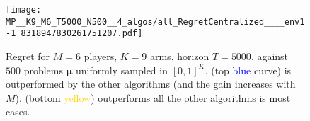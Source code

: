 %
%
\begin{figure}[!b]
    \texttt{[image: MP\_\_K9\_M6\_T5000\_N500\_\_4\_algos/all\_RegretCentralized\_\_\_\_env1-1\_8318947830261751207.pdf]}
  \caption[Regret for $M=6$ players, $K=9$ arms, horizon $T=5000$, against $500$ problems $\boldsymbol{\mu}$ uniformly sampled]{Regret for $M=6$ players, $K=9$ arms, horizon $T=5000$, against $500$ problems $\boldsymbol{\mu}$ uniformly sampled in $[0,1]^K$. \rhoRand{} (top \textcolor{blue}{blue} curve) is outperformed by the other algorithms (and the gain increases with $M$). \MCTopM{} (bottom \textcolor{gold}{yellow}) outperforms all the other algorithms is most cases.}
  \label{fig:5:MP__K9_M6_T5000_N500__4_algos__all_RegretCentralized__BayesianProblems}
\end{figure}


%
%

